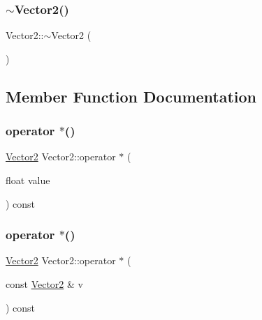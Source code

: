 \mbox{\label{class_vector2_ada03f5433d3ca4841d5ebb90b167202e}} 
\subsubsection{\texorpdfstring{$\sim$Vector2()}{~Vector2()}}
{\footnotesize\ttfamily Vector2\+::$\sim$\+Vector2 (\begin{DoxyParamCaption}{ }\end{DoxyParamCaption})\hspace{0.3cm}{\ttfamily [inline]}}



\subsection{Member Function Documentation}
\mbox{\label{class_vector2_a4826ebaa5538b4eb8cf81a1b726db4f8}} 
\subsubsection{\texorpdfstring{operator $\ast$()}{operator *()}\hspace{0.1cm}{\footnotesize\ttfamily [1/2]}}
{\footnotesize\ttfamily \mbox{\hyperlink{class_vector2}{Vector2}} Vector2\+::operator $\ast$ (\begin{DoxyParamCaption}\item[{float}]{value }\end{DoxyParamCaption}) const\hspace{0.3cm}{\ttfamily [inline]}}

\mbox{\label{class_vector2_a1376f2434ab2aa292d07e0b8f0f7e663}} 
\subsubsection{\texorpdfstring{operator $\ast$()}{operator *()}\hspace{0.1cm}{\footnotesize\ttfamily [2/2]}}
{\footnotesize\ttfamily \mbox{\hyperlink{class_vector2}{Vector2}} Vector2\+::operator $\ast$ (\begin{DoxyParamCaption}\item[{const \mbox{\hyperlink{class_vector2}{Vector2}} \&}]{v }\end{DoxyParamCaption}) const\hspace{0.3cm}{\ttfamily [inline]}}

